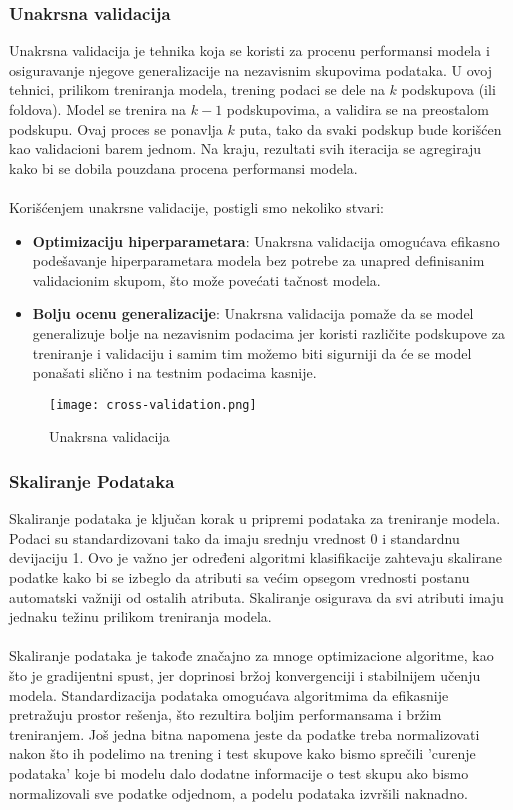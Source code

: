 \documentclass[a4paper,12pt]{article}
\begin{document}
\subsubsection{Unakrsna validacija}
Unakrsna validacija je tehnika koja se koristi za procenu performansi modela i osiguravanje njegove generalizacije na nezavisnim skupovima podataka. U ovoj tehnici, prilikom treniranja modela, trening podaci se dele na $k$ podskupova (ili foldova). Model se trenira na $k-1$ podskupovima, a validira se na preostalom podskupu. Ovaj proces se ponavlja $k$ puta, tako da svaki podskup bude korišćen kao validacioni barem jednom. Na kraju, rezultati svih iteracija se agregiraju kako bi se dobila pouzdana procena performansi modela.\\\\
Korišćenjem unakrsne validacije, postigli smo nekoliko stvari:
\begin{itemize}
    \item \textbf{Optimizaciju hiperparametara}: Unakrsna validacija omogućava efikasno podešavanje hiperparametara modela bez potrebe za unapred definisanim validacionim skupom, što može povećati tačnost modela.
    \item \textbf{Bolju ocenu generalizacije}: Unakrsna validacija pomaže da se model generalizuje bolje na nezavisnim podacima jer koristi različite podskupove za treniranje i validaciju i samim tim možemo biti sigurniji da će se model ponašati slično i na testnim podacima kasnije.
\end{itemize}

\begin{figure}[H]
\centering
\texttt{[image: cross-validation.png]}
\caption{Unakrsna validacija}
\label{fig:cross_validation}
\end{figure}

\subsubsection{Skaliranje Podataka}
Skaliranje podataka je ključan korak u pripremi podataka za treniranje modela. Podaci su standardizovani tako da imaju srednju vrednost 0 i standardnu devijaciju 1. Ovo je važno jer određeni algoritmi klasifikacije zahtevaju skalirane podatke kako bi se izbeglo da atributi sa većim opsegom vrednosti postanu automatski važniji od ostalih atributa. Skaliranje osigurava da svi atributi imaju jednaku težinu prilikom treniranja modela.\\\\
Skaliranje podataka je takođe značajno za mnoge optimizacione algoritme, kao što je gradijentni spust, jer doprinosi bržoj konvergenciji i stabilnijem učenju modela. Standardizacija podataka omogućava algoritmima da efikasnije pretražuju prostor rešenja, što rezultira boljim performansama i bržim treniranjem.
Još jedna bitna napomena jeste da podatke treba normalizovati nakon što ih podelimo na trening i test skupove kako bismo sprečili 'curenje podataka' koje bi modelu dalo dodatne informacije o test skupu ako bismo normalizovali sve podatke odjednom, a podelu podataka izvršili naknadno.
\end{document}
